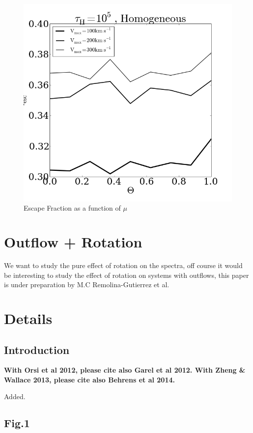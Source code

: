 \documentclass[12pt]{article}
\begin{document}
\begin{figure}
\includegraphics[scale=0.5]{escapefractionvstheta.png}
\caption{Escape Fraction as a function of $\mu$
\label{escape_fraction}}
\end{figure}


\section*{Outflow + Rotation}

We want to study the pure effect of rotation on the spectra, off course it would
be interesting to study the effect of rotation on systems with
outflows, this paper is under preparation by M.C Remolina-Gutierrez et
al.   

\section*{Details}

\subsection*{Introduction}

{\bf With Orsi et al 2012, please cite also Garel et al 2012. With Zheng \& Wallace 2013, please cite also Behrens et al 2014.}

Added.

\subsection*{Fig.1}
\end{document}
